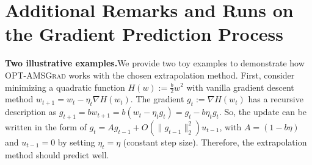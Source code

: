 \documentclass[11pt]{article}
\theoremstyle{k}
\begin{document}
\section{Additional Remarks and Runs on the Gradient Prediction Process}
\textbf{Two illustrative examples.}\hspace{0.1in}We provide two toy examples to demonstrate how \textsc{OPT-AMSGrad} works with the chosen extrapolation method. First, consider minimizing a quadratic function $H(w) := \frac{b}{2} w^2 $  
with vanilla gradient descent method $w_{t+1} = w_t - \eta_t \nabla H(w_t)$. 
The gradient $g_{t}:= \nabla H(w_{t})$ has a recursive description as  $g_{t+1} = b w_{t+1} = b ( w_t  - \eta_t g_t ) = g_t - b \eta_t g_t  $.
So, the update can be written in the form of $g_t = A g_{t-1}  + O( \| g_{t-1} \|_2^2 ) u_{t-1}$, with $A = (1 - b \eta)$ and $u_{t-1}=0$ by setting $\eta_t=\eta$ (constant step size).
Therefore, the extrapolation method should predict well.
\end{document}
